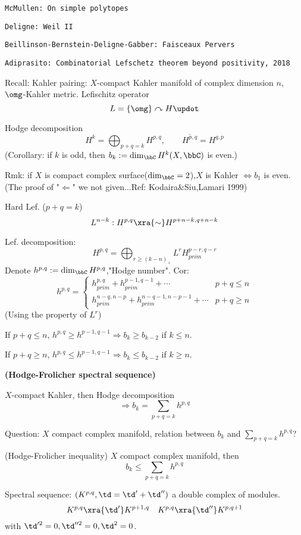\verb"McMullen: On simple polytopes"

\verb"Deligne: Weil II"

\verb"Beillinson-Bernstein-Deligne-Gabber: Faisceaux Pervers"

\verb"Adiprasito: Combinatorial Lefschetz theorem beyond positivity, 2018"



Recall: Kahler pairing:
$X$-compact Kahler manifold of complex dimension $n$, $\omg$-Kahler metric.
Lefischitz operator 
$$L=\{\omg\}\curvearrowright H\updot$$

Hodge decomposition 
$$H^k=\bigoplus_{p+q=k}H^{p,q},\qquad \overline{H^{p,q}}=H^{q,p}$$
(Corollary: if $k$ is odd, then $b_k:=\dim_{\bbC}H^k(X,\bbC)$ is even.)

Rmk: if $X$ is compact complex surface($\dim_{\bbC}=2$),$X$ is Kahler $\iff b_1$ is even.
(The proof of "$\Leftarrow$" we not given...Ref: Kodaira\&Siu,Lamari 1999) 

Hard Lef. ($p+q=k$)
$$L^{n-k}:H^{p,q}\xra{\sim}H^{p+n-k,q+n-k}$$

Lef. decomposition:
$$H^{p,q}=\bigoplus_{r\geq (k-n)_+} L^rH_{prim}^{p-r,q-r}$$
Denote $h^{p,q}:=\dim_{\bbC}H^{p,q}$,"Hodge number".
Cor:
$$
  h^{p,q}=
  \left\{
    \begin{array}{lc}
      h_{prim}^{p,q}+h_{prim}^{p-1,q-1}+\cdots & p+q\leq n\\
      h_{prim}^{n-q,n-p}
       +h_{prim}^{n-q-1,n-p-1}+\cdots & p+q\geq n
    \end{array}
  \right.
$$
(Using the property of $L^r$)

If $p+q\leq n$, $h^{p,q}\geq h^{p-1,q-1}\Rightarrow
b_k\geq b_{k-2}$ if $k\leq n$.

If $p+q\geq n$, $h^{p,q}\leq h^{p-1,q-1}\Rightarrow b_k\leq b_{k-2}$
if $k\geq n$.

\textbf{(Hodge-Frolicher spectral sequence)}

$X$-compact Kahler, then Hodge decomposition 
$$\Rightarrow b_k=\sum_{p+q=k}h^{p,q}$$

Question: $X$ compact complex manifold, relation between 
$b_k$ and $\sum\limits_{p+q=k}h^{p,q}$?

\begin{thm}(Hodge-Frolicher inequality)
$X$ compact complex manifold, then
$$b_k\leq\sum_{p+q=k} h^{p,q}$$
\end{thm}

Spectral sequence:
$(K^{p,q},\td=\td'+\td'')$ a double complex of modules.
$$K^{p,q}\xra{\td'}K^{p+1,q}\quad
K^{p,q}\xra{\td''}K^{p,q+1}$$
with $\td'^2=0,\td''^2=0,\td^2=0$.

